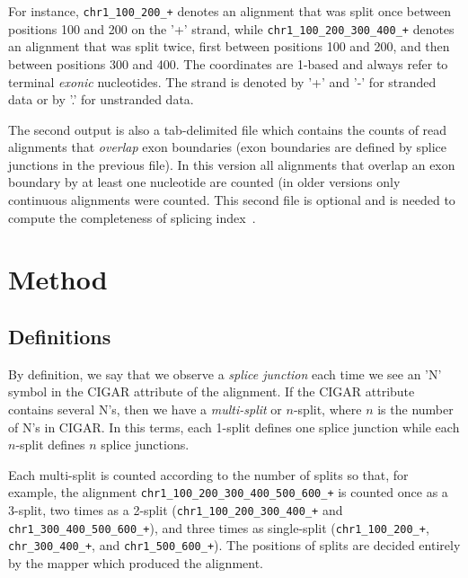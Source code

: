 \documentclass{article}
\begin{document}
For instance, {\tt chr1\_100\_200\_+} denotes an alignment that was split once between positions 100 and 200 on the '+' 
strand, while {\tt chr1\_100\_200\_300\_400\_+} denotes an alignment that was split twice, first between positions 100 
and 200, and then between positions 300 and 400. The coordinates are 1-based and always refer to terminal {\em exonic} 
nucleotides. The strand is denoted by '+' and '-' for stranded data or by '.' for unstranded data.

The second output is also a tab-delimited file which contains the counts of read alignments that {\em overlap} exon 
boundaries (exon boundaries are defined by splice junctions in the previous file). In this version all alignments that 
overlap an exon boundary by at least one nucleotide are counted (in older versions only continuous alignments were counted. 
This second file is optional and is needed to compute the completeness of splicing index~\cite{pmid23172860, pmid22955974}.

\section{Method}
\subsection{Definitions}
By definition, we say that we observe a {\em splice junction} each time we see an 'N' symbol in the CIGAR attribute 
of the alignment. If the CIGAR attribute contains several N's, then we have a {\em multi-split} or $n$-split, where $n$ 
is the number of N's in CIGAR. In this terms, each 1-split defines one splice junction while each $n$-split defines
$n$ splice junctions. 

Each multi-split is counted according to the number of splits so that, for example, the 
alignment {\tt chr1\_100\_200\_300\_400\_500\_600\_+} is counted once as a 3-split, two times 
as a 2-split ({\tt chr1\_100\_200\_300\_400\_+} and {\tt chr1\_300\_400\_500\_600\_+}), and three times 
as single-split ({\tt chr1\_100\_200\_+}, {\tt chr\_300\_400\_+}, and {\tt chr1\_500\_600\_+}). 
The positions of splits are decided entirely by the mapper which produced the alignment.
\end{document}
